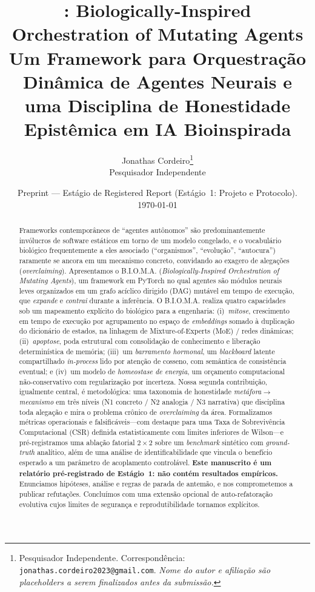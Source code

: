 \documentclass[11pt]{article}
\title{\bioma{}: Biologically-Inspired Orchestration of Mutating Agents\\[2pt]
\large Um Framework para Orquestração Dinâmica de Agentes Neurais e uma
Disciplina de Honestidade Epistêmica em IA Bioinspirada}
\author{%
Jonathas Cordeiro\thanks{Pesquisador Independente. Correspondência:
\texttt{jonathas.cordeiro2023@gmail.com}. \emph{Nome do autor e afiliação são
placeholders a serem finalizados antes da submissão.}}\\
Pesquisador Independente}
\date{Preprint --- Estágio de Registered Report (Estágio~1: Projeto e Protocolo). \\
\today}
\newcommand{\bioma}{\textsc{B.I.O.M.A.}}
\begin{document}
\maketitle

\begin{abstract}
\noindent
Frameworks contemporâneos de ``agentes autônomos'' são predominantemente
invólucros de software estáticos em torno de um modelo congelado, e o
vocabulário biológico frequentemente a eles associado (``organismos'',
``evolução'', ``autocura'') raramente se ancora em um mecanismo concreto,
convidando ao exagero de alegações (\emph{overclaiming}). Apresentamos o
\bioma{} (\emph{Biologically-Inspired Orchestration of Mutating Agents}), um
framework em PyTorch no qual agentes são módulos neurais leves organizados em um
grafo acíclico dirigido (DAG) mutável em tempo de execução, que \emph{expande} e
\emph{contrai} durante a inferência. O \bioma{} realiza quatro capacidades sob um
mapeamento explícito do biológico para a engenharia: (i)~\emph{mitose},
crescimento em tempo de execução por agrupamento no espaço de \emph{embeddings}
somado à duplicação do dicionário de estados, na linhagem de Mixture-of-Experts
(MoE) / redes dinâmicas; (ii)~\emph{apoptose}, poda estrutural com consolidação
de conhecimento e liberação determinística de memória; (iii)~um \emph{barramento
hormonal}, um \emph{blackboard} latente compartilhado \emph{in-process} lido por
atenção de cosseno, com semântica de consistência eventual; e (iv)~um modelo de
\emph{homeostase de energia}, um orçamento computacional não-conservativo com
regularização por incerteza. Nossa segunda contribuição, igualmente central, é
metodológica: uma taxonomia de honestidade \emph{metáfora$\rightarrow$mecanismo}
em três níveis (N1 concreto / N2 analogia / N3 narrativa) que disciplina toda
alegação e mira o problema crônico de \emph{overclaiming} da área. Formalizamos
métricas operacionais e falsificáveis---com destaque para uma Taxa de
Sobrevivência Computacional (CSR) definida estatisticamente com limites
inferiores de Wilson---e pré-registramos uma ablação fatorial $2\times2$ sobre um
\emph{benchmark} sintético com \emph{ground-truth} analítico, além de uma análise
de identificabilidade que vincula o benefício esperado a um parâmetro de
acoplamento controlável. \textbf{Este manuscrito é um relatório pré-registrado de
Estágio~1: não contém resultados empíricos.} Enunciamos hipóteses, análise e
regras de parada de antemão, e nos comprometemos a publicar refutações.
Concluímos com uma extensão opcional de auto-refatoração evolutiva cujos limites
de segurança e reprodutibilidade tornamos explícitos.
\end{abstract}
\end{document}
